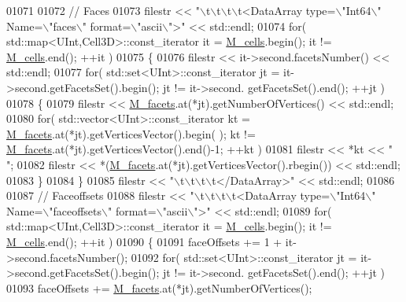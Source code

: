 \begin{DoxyCode}
01071 
01072     \textcolor{comment}{//  Faces}
01073     filestr << \textcolor{stringliteral}{"\(\backslash\)t\(\backslash\)t\(\backslash\)t\(\backslash\)t<DataArray type=\(\backslash\)"Int64\(\backslash\)" Name=\(\backslash\)"faces\(\backslash\)" format=\(\backslash\)"ascii\(\backslash\)">"} << std::endl;
01074     \textcolor{keywordflow}{for}( std::map<UInt,Cell3D>::const\_iterator it = \hyperlink{classFVCode3D_1_1Mesh3D_a8cac877e809226fb96078183efb25a2f}{M\_cells}.begin(); it != 
      \hyperlink{classFVCode3D_1_1Mesh3D_a8cac877e809226fb96078183efb25a2f}{M\_cells}.end(); ++it )
01075     \{
01076         filestr << it->second.facetsNumber() << std::endl;
01077         \textcolor{keywordflow}{for}( std::set<UInt>::const\_iterator jt = it->second.getFacetsSet().begin(); jt != it->second.
      getFacetsSet().end(); ++jt )
01078         \{
01079             filestr << \hyperlink{classFVCode3D_1_1Mesh3D_a57d8b6af7f4385d749c2d83c235764de}{M\_facets}.at(*jt).getNumberOfVertices() << std::endl;
01080             \textcolor{keywordflow}{for}( std::vector<UInt>::const\_iterator kt = \hyperlink{classFVCode3D_1_1Mesh3D_a57d8b6af7f4385d749c2d83c235764de}{M\_facets}.at(*jt).getVerticesVector().begin(
      ); kt != \hyperlink{classFVCode3D_1_1Mesh3D_a57d8b6af7f4385d749c2d83c235764de}{M\_facets}.at(*jt).getVerticesVector().end()-1; ++kt )
01081                 filestr << *kt << \textcolor{stringliteral}{" "};
01082             filestr << *(\hyperlink{classFVCode3D_1_1Mesh3D_a57d8b6af7f4385d749c2d83c235764de}{M\_facets}.at(*jt).getVerticesVector().rbegin()) << std::endl;
01083         \}
01084     \}
01085     filestr << \textcolor{stringliteral}{"\(\backslash\)t\(\backslash\)t\(\backslash\)t\(\backslash\)t</DataArray>"} << std::endl;
01086 
01087     \textcolor{comment}{//  Faceoffsets}
01088     filestr << \textcolor{stringliteral}{"\(\backslash\)t\(\backslash\)t\(\backslash\)t\(\backslash\)t<DataArray type=\(\backslash\)"Int64\(\backslash\)" Name=\(\backslash\)"faceoffsets\(\backslash\)" format=\(\backslash\)"ascii\(\backslash\)">"} << std::endl;
01089     \textcolor{keywordflow}{for}( std::map<UInt,Cell3D>::const\_iterator it = \hyperlink{classFVCode3D_1_1Mesh3D_a8cac877e809226fb96078183efb25a2f}{M\_cells}.begin(); it != 
      \hyperlink{classFVCode3D_1_1Mesh3D_a8cac877e809226fb96078183efb25a2f}{M\_cells}.end(); ++it )
01090     \{
01091         faceOffsets += 1 + it->second.facetsNumber();
01092         \textcolor{keywordflow}{for}( std::set<UInt>::const\_iterator jt = it->second.getFacetsSet().begin(); jt != it->second.
      getFacetsSet().end(); ++jt )
01093             faceOffsets += \hyperlink{classFVCode3D_1_1Mesh3D_a57d8b6af7f4385d749c2d83c235764de}{M\_facets}.at(*jt).getNumberOfVertices();

\end{DoxyCode}

